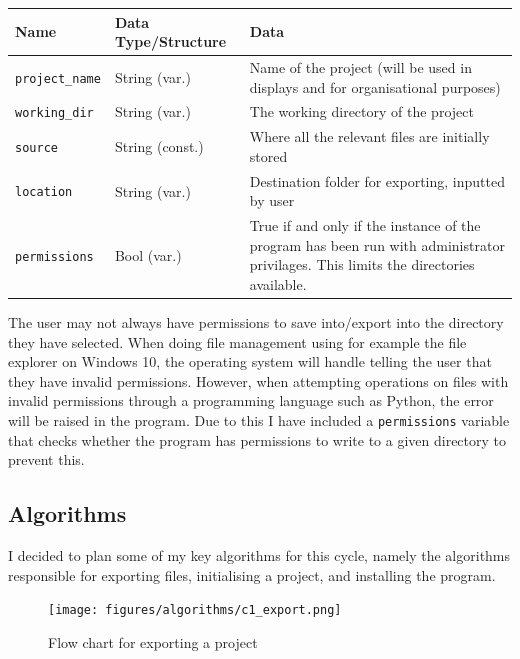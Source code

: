 \documentclass[tikz, 11pt]{article}
\begin{document}
            \begin{table}[!ht]
            \begin{center}
                \begin{tabular}{llm{}}
                Name & Data Type/Structure & Data \\ \hline
                \verb|project_name| & String (var.) & Name of the project (will be used in displays and for organisational purposes) \\
                \verb|working_dir| & String (var.) & The working directory of the project \\
                \verb|source| & String (const.) & Where all the relevant files are initially stored \\
                \verb|location| & String (var.) & Destination folder for exporting, inputted by user \\
                \verb|permissions| & Bool (var.) & True if and only if the instance of the program has been run with administrator privilages. This limits the directories available.
                \end{tabular}
            \end{center}
            \end{table}

            The user may not always have permissions to save into/export into the directory they have selected. When doing file management using for example the file explorer on Windows 10, the operating system will handle telling the user that they have invalid permissions. However, when attempting operations on files with invalid permissions through a programming language such as Python, the error will be raised in the program. Due to this I have included a \verb|permissions| variable that checks whether the program has permissions to write to a given directory to prevent this.

            \pagebreak
        \subsection{Algorithms}
            I decided to plan some of my key algorithms for this cycle, namely the algorithms responsible for exporting files, initialising a project, and installing the program. 
            \begin{figure}
                \texttt{[image: figures/algorithms/c1\_export.png]}
                \caption{Flow chart for exporting a project}
            \end{figure}
            
\end{document}
